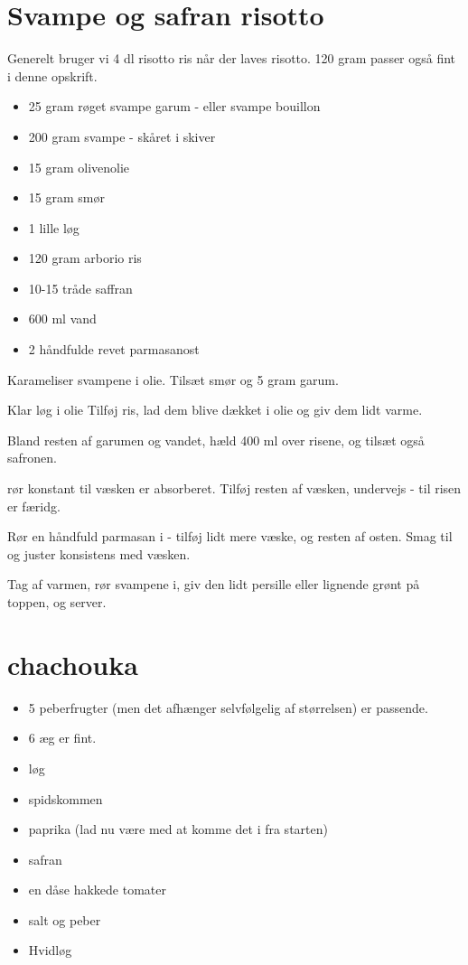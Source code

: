 \documentclass[
]{book}
\providecommand{\tightlist}{%
  \setlength{\itemsep}{0pt}\setlength{\parskip}{0pt}}
\begin{document}
\section{Svampe og safran risotto}\label{svampe-og-safran-risotto}

Generelt bruger vi 4 dl risotto ris når der laves risotto.
120 gram passer også fint i denne opskrift.

\begin{itemize}
\tightlist
\item
  25 gram røget svampe garum - eller svampe bouillon
\item
  200 gram svampe - skåret i skiver
\item
  15 gram olivenolie
\item
  15 gram smør
\item
  1 lille løg
\item
  120 gram arborio ris
\item
  10-15 tråde saffran
\item
  600 ml vand
\item
  2 håndfulde revet parmasanost
\end{itemize}

Karameliser svampene i olie.
Tilsæt smør og 5 gram garum.

Klar løg i olie
Tilføj ris, lad dem blive dækket i olie og giv dem lidt varme.

Bland resten af garumen og vandet, hæld 400 ml over risene, og
tilsæt også safronen.

rør konstant til væsken er absorberet. Tilføj resten af
væsken, undervejs - til risen er færidg.

Rør en håndfuld parmasan i - tilføj lidt mere væske, og
resten af osten. Smag til og juster konsistens med væsken.

Tag af varmen, rør svampene i, giv den lidt persille eller lignende
grønt på toppen, og server.

\section{chachouka}\label{chachouka}

\begin{itemize}
\tightlist
\item
  5 peberfrugter (men det afhænger selvfølgelig af størrelsen) er passende.
\item
  6 æg er fint.
\item
  løg
\item
  spidskommen
\item
  paprika (lad nu være med at komme det i fra starten)
\item
  safran
\item
  en dåse hakkede tomater
\item
  salt og peber
\item
  Hvidløg
\end{itemize}
\end{document}
